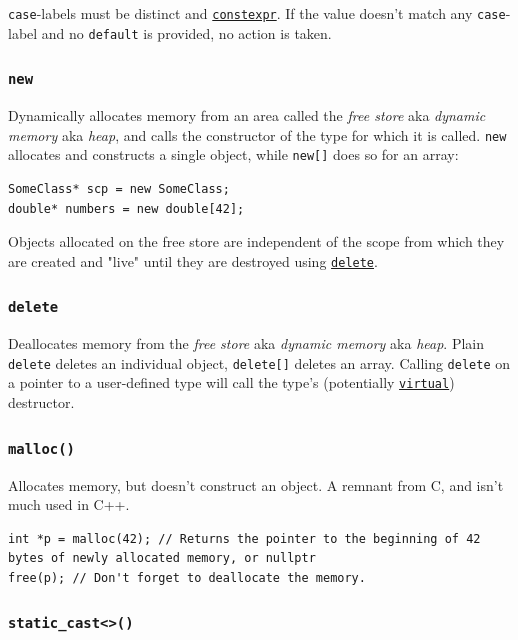 \documentclass[table, xcdraw]{article}%
\begin{document}
\texttt{case}-labels must be distinct and \hyperref[constexpr]{\texttt{constexpr}}. If  the value doesn't match any \texttt{case}-label and no \texttt{default} is provided, no action is taken. 


\subsubsection{\texttt{new}} \label{new}
Dynamically allocates memory from an area called the \textit{free store} aka \textit{dynamic memory} aka \textit{heap}, and calls the constructor of the type for which it is called. \texttt{new} allocates and constructs a single object, while \texttt{new[]} does so for an array:

\begin{verbatim}
SomeClass* scp = new SomeClass;
double* numbers = new double[42];
\end{verbatim}

Objects allocated on the free store are independent of the scope from which they are created and "live" until they are destroyed using \hyperref[delete]{\texttt{delete}}.

\subsubsection{\texttt{delete}} \label{delete}
Deallocates memory from the \textit{free store} aka \textit{dynamic memory} aka \textit{heap}. Plain \texttt{delete} deletes an individual object, \texttt{delete[]} deletes an array. Calling \texttt{delete} on a pointer to a user-defined type will call the type's (potentially \hyperref[virtual]{\texttt{virtual}}) destructor.

\subsubsection{\texttt{malloc()}}

Allocates memory, but doesn't construct an object. A remnant from C, and isn't much used in C++.

\begin{verbatim}
int *p = malloc(42); // Returns the pointer to the beginning of 42 bytes of newly allocated memory, or nullptr
free(p); // Don't forget to deallocate the memory.
\end{verbatim}

\subsubsection{\texttt{static_cast<>()}} \label{staticcast}
\end{document}
